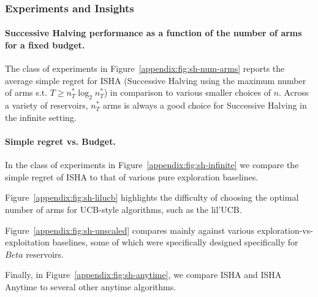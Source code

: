 \subsubsection{Experiments and Insights}\label{appendix:fb-experiments}
\paragraph{Successive Halving performance as a function of the number of arms for a fixed budget.}
The class of experiments in Figure~\ref{appendix:fig:sh-num-arms} reports the average simple regret for ISHA (Successive Halving using the maximum number of arms s.t. $T \ge n^*_T\log_2 n^*_T$) in comparison to various
smaller choices of $n$. Across a variety of reservoirs, $n^*_T$ arms is always a good choice for Successive Halving in the infinite setting.

\paragraph{Simple regret vs. Budget.} 
In the class of experiments in Figure~\ref{appendix:fig:sh-infinite} we compare the simple regret of
ISHA to that of various pure exploration baselines.
 
Figure~\ref{appendix:fig:sh-lilucb} highlights the difficulty of
choosing the optimal number of arms for UCB-style algorithms,
such as the lil'UCB.

Figure~\ref{appendix:fig:sh-unscaled} compares mainly against various exploration-vs-exploitation baselines, some of which were specifically designed specifically for $Beta$ reservoirs.

Finally, in Figure~\ref{appendix:fig:sh-anytime}, we compare ISHA  and ISHA Anytime to several other anytime algorithms.

\clearpage


